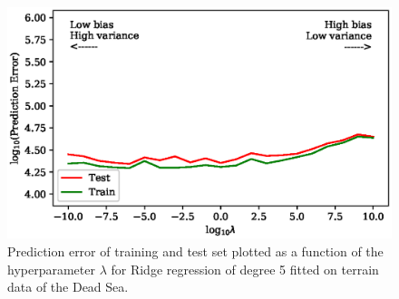 \documentclass[a4paper, 10pt]{article}
\begin{document}
\begin{figure}[H]
    \includegraphics{figs/biasvariancetradeoff_Ridge_terrain.eps}
    \caption{Prediction error of training and test set plotted as a function of the hyperparameter $\lambda$ for Ridge regression of degree 5 fitted on terrain data of the Dead Sea.}
    \label{fig:bias_ridge_terrain}
\end{figure}
\end{document}

